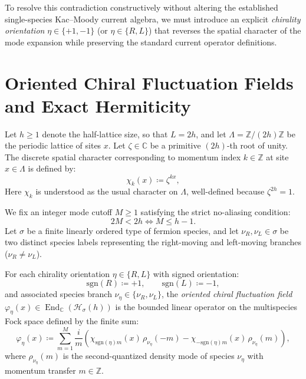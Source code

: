 To resolve this contradiction constructively without altering the established single-species Kac--Moody current algebra, we must introduce an explicit \emph{chirality orientation} $\eta \in \{+1, -1\}$ (or $\eta \in \{R, L\}$) that reverses the spatial character of the mode expansion while preserving the standard current operator definitions.

\section{Oriented Chiral Fluctuation Fields and Exact Hermiticity}

Let $h \ge 1$ denote the half-lattice size, so that $L = 2h$, and let $\Lambda = \mathbb{Z}/(2h)\mathbb{Z}$ be the periodic lattice of sites $x$. Let $\zeta \in \mathbb{C}$ be a primitive $(2h)$-th root of unity. The discrete spatial character corresponding to momentum index $k \in \mathbb{Z}$ at site $x \in \Lambda$ is defined by:
\begin{equation}
\chi_k(x) \coloneqq \zeta^{k x},
\end{equation}
Here $\chi_k$ is understood as the usual character on $\Lambda$, well-defined because $\zeta^{2h}=1$.

We fix an integer mode cutoff $M \ge 1$ satisfying the strict no-aliasing condition:
\begin{equation}
2M < 2h \iff M \le h - 1.
\end{equation}
Let $\sigma$ be a finite linearly ordered type of fermion species, and let $\nu_R, \nu_L \in \sigma$ be two distinct species labels representing the right-moving and left-moving branches ($\nu_R \neq \nu_L$).

\begin{definition}
\label{def:chiral_fluctuation_field}
For each chirality orientation $\eta \in \{R, L\}$ with signed orientation:
\begin{equation}
\mathrm{sgn}(R) \coloneqq +1, \qquad \mathrm{sgn}(L) \coloneqq -1,
\end{equation}
and associated species branch $\nu_\eta \in \{\nu_R, \nu_L\}$, the \emph{oriented chiral fluctuation field} $\varphi_\eta(x) \in \operatorname{End}_{\mathbb{C}}(\mathcal{H}_\sigma(h))$ is the bounded linear operator on the multispecies Fock space defined by the finite sum:
\begin{equation}
\varphi_\eta(x) \coloneqq \sum_{m=1}^M \frac{i}{m} \left( \chi_{\mathrm{sgn}(\eta) m}(x)\, \rho_{\nu_\eta}(-m) - \chi_{-\mathrm{sgn}(\eta) m}(x)\, \rho_{\nu_\eta}(m) \right),
\end{equation}
where $\rho_{\nu_\eta}(m)$ is the second-quantized density mode of species $\nu_\eta$ with momentum transfer $m \in \mathbb{Z}$.
\end{definition}

